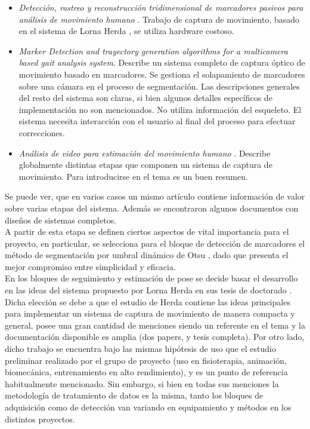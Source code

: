 \begin{itemize}
\begin{itemize}
		\item \emph{Detección, rastreo y reconstrucción tridimensional de marcadores pasivos para análisis de movimiento humano} \cite{colombianos}.	Trabajo de captura de movimiento, basado en el sistema de Lorna Herda \cite{herda}, se utiliza hardware costoso.
		\item \emph{Marker Detection and trayectory generation algorithms for a multicamera based gait analysis system}\cite{shafiq2001marker}.
		Describe un sistema completo de captura óptico de movimiento basado en marcadores.
		Se gestiona el solapamiento de marcadores sobre una cámara en el proceso de segmentación. Las descripciones generales del resto del sistema son claras, si bien algunos detalles específicos de implementación no son mencionados.
		No utiliza información del esqueleto. El sistema necesita interacción con el usuario al final del proceso para efectuar correcciones. 
		\item \emph{Análisis de video para estimación del movimiento humano} \cite{martinez2009analisis}. Describe globalmente distintas etapas que componen un sistema de captura de movimiento. Para introducirse en el tema es un buen resumen.
	\end{itemize}
\end{itemize}

Se puede ver, que en varios casos un mismo artículo contiene información de valor sobre varias etapas del sistema. Además se encontraron algunos documentos con diseños de sistemas completos.
\\ 

A partir de esta etapa se definen ciertos aspectos de vital importancia para el proyecto, en particular, se selecciona para el bloque de detección de marcadores el método de segmentación por umbral dinámico de Otsu \cite{otsu}, dado que presenta el mejor compromiso entre simplicidad y eficacia.
\\ 

En los bloques de seguimiento y estimación de pose se decide basar el desarrollo en las ideas del sistema propuesto por Lorna Herda en sus tesis de doctorado \cite{herda}. Dicha elección se debe a que el estudio de Herda contiene las ideas principales para implementar un sistema de captura de movimiento de manera compacta y general, posee una gran cantidad de menciones siendo un referente en el tema y la documentación disponible es amplia (dos papers, y tesis completa). Por otro lado, dicho trabajo se encuentra bajo las mismas hipótesis de uso que el estudio preliminar realizado por el grupo de proyecto (uso en fisioterapia, animación, biomecánica, entrenamiento en alto rendimiento), y es un punto de referencia habitualmente mencionado. Sin embargo, si bien en todas sus menciones la metodología de tratamiento de datos es la misma, tanto los bloques de adquisición como de detección van variando en equipamiento y métodos en los distintos proyectos.